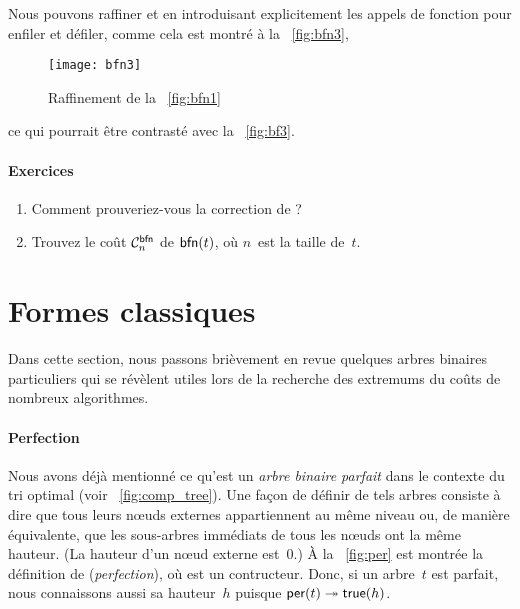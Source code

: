Nous pouvons raffiner 
et  en introduisant
explicitement les appels de fonction pour enfiler et défiler, comme
cela est montré à la \fig~\vref{fig:bfn3},
\begin{figure}[!t]
\centering
\texttt{[image: bfn3]}
\caption{Raffinement de la \fig~\vref{fig:bfn1}}
\label{fig:bfn3}
\end{figure}
ce qui pourrait être contrasté avec la \fig~\vref{fig:bf3}.

\paragraph{Exercices}
\begin{enumerate}

  \item Comment prouveriez-vous la correction de
  ?

\medskip

  \item Trouvez le coût \(\C{\fun{bfn}}{n}\) de \(\fun{bfn}(t)\), où
  \(n\)~est la taille
  de~\(t\).

\end{enumerate}

\clearpage

\section{Formes classiques}

Dans cette section, nous passons brièvement en revue quelques arbres
binaires particuliers qui se révèlent utiles lors de la recherche des
extremums du coûts de nombreux algorithmes.

\paragraph{Perfection}
\label{par:perfection}

 Nous avons déjà mentionné ce
qu'est un \emph{arbre binaire parfait} dans le contexte du tri optimal
(voir \fig~\vref{fig:comp_tree}). Une façon de définir de tels arbres
consiste à dire que tous leurs nœuds externes appartiennent au
même niveau ou, de manière équivalente, que les sous-arbres immédiats
de tous les nœuds ont la même hauteur. (La
hauteur d'un nœud externe est~\(0\).) À la \fig~\vref{fig:per} est
montrée la définition de 
(\emph{perfection}), où  est un contructeur. Donc, si un
arbre~\(t\) est parfait, nous connaissons aussi sa hauteur~\(h\)
puisque \(\fun{per}(t) \twoheadrightarrow \fun{true}(h)\).

